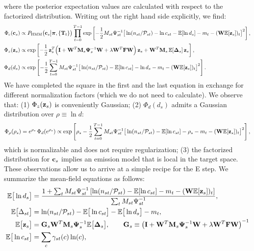 \documentclass[nofootinbib,amssymb,amsmath]{revtex4}
\newcommand{\vI}{{\bf I}}
\newcommand{\vc}{{\bf c}}
\newcommand{\vz}{{\bf z}}
\newcommand{\vG}{{\bf G}}
\newcommand{\vM}{{\bf M}}
\newcommand{\vW}{{\bf W}}
\newcommand{\vF}{{\bf F}}
\newcommand{\vPsi}{{\bf \Psi}}
\newcommand{\vpi}{{\boldsymbol \pi}}
\newcommand{\PP}{\mathcal{P}}
\newcommand{\EE}{\mathbb{E}}
\begin{document}
where the posterior expectation values are calculated with respect to the factorized distribution. Writing out the right hand side explicitly, we find:
\begin{align}
\label{eq:Phi_c}
\Phi_c(\vc_s) &\propto P_\mathrm{HMM}\big(\vc_s \big|\vpi, \{\mathbf{T}_t\}\big)\prod_{t=0}^{T-1} \exp\left[- \frac{1}{2} M_{st}\Psi_{st}^{-1}\big[\ln(n_{st}/\PP_{st}) - \ln c_{st} - \EE[\ln d_s] - m_t - (\vW \EE[\vz_s])_t\big]^2\right],\\
\Phi_z(\vz_s) &\propto \exp\left[-\frac{1}{2} \, \vz_s^T \Big(\vI + \vW^T \vM_s \vPsi_s^{-1}\vW + \lambda \vW^T \vF \vW \Big)\,\vz_s + \vW^T \vM_{s} \, \EE[\mathbf{\Delta}_{s}]\,\vz_s \right],\\
\Phi_d(d_s) &\propto \exp\left[- \frac{1}{2} \sum_{t=0}^{T-1} M_{st}\Psi_{st}^{-1}\big[\ln(n_{st}/\PP_{st}) - \EE[\ln c_{st}] - \ln d_s - m_t - (\vW \EE[\vz_s])_t\big]^2\right].
\end{align}
We have completed the square in the first and the last equation in exchange for different normalization factors (which we do not need to calculate). We observe that: (1) $\Phi_z(\vz_s)$ is conveniently Gaussian; (2) $\Phi_d(d_s)$ admits a Gaussian distribution over $\rho \equiv \ln d$:
\begin{equation}
\Phi_\rho(\rho_s) = e^{\rho_s}\,\Phi_d(e^{\rho_s}) \propto \exp\left[ \rho_s - \frac{1}{2} \sum_{t=0}^{T-1} M_{st}\Psi_{st}^{-1}\big[\ln(n_{st}/\PP_{st}) - \EE[\ln c_{st}] - \rho_s - m_t - (\vW \EE[\vz_s])_t\big]^2\right],
\end{equation}
which is normalizable and does not require regularization; (3) the factorized distribution for $\vc_s$  implies an emission model that is local in the target space. These observations allow us to arrive at a simple recipe for the E step. We summarize the mean-field equations as follows:
\begin{subequations}
\begin{align}
\EE\big[\ln d_s \big] &= \frac{1 + \sum_t M_{st} \Psi_{st}^{-1}\left[\ln(n_{st}/\PP_{st}) - \EE[\ln c_{st}] - m_t - (\vW \EE[\vz_s])_t\right]}{\sum_t M_{st} \Psi_{st}^{-1}},\nonumber\\
\EE\big[\Delta_{st}\big] &= \ln(n_{st}/\PP_{st}) - \EE\big[\ln c_{st}\big] - \EE\big[\ln d_s\big] - m_t,\\
\EE\big[\vz_s\big] &= \vG_s \vW^T \vM_s \vPsi_s^{-1} \EE\big[\mathbf{\Delta}_s\big],\qquad \vG_s \equiv \left( \vI + \vW^T \vM_s \vPsi_s^{-1} \vW + \lambda \vW^T \vF \vW \right)^{-1}\\
\EE\big[\ln c_{st}\big] &= \sum_{c} \gamma_{st}(c) \ln(c),
\end{align}
\end{subequations}
\end{document}
